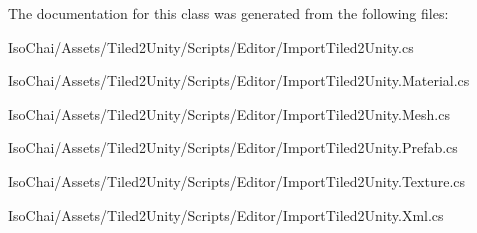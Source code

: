 The documentation for this class was generated from the following files\+:\begin{DoxyCompactItemize}
\item 
Iso\+Chai/\+Assets/\+Tiled2\+Unity/\+Scripts/\+Editor/Import\+Tiled2\+Unity.\+cs\item 
Iso\+Chai/\+Assets/\+Tiled2\+Unity/\+Scripts/\+Editor/Import\+Tiled2\+Unity.\+Material.\+cs\item 
Iso\+Chai/\+Assets/\+Tiled2\+Unity/\+Scripts/\+Editor/Import\+Tiled2\+Unity.\+Mesh.\+cs\item 
Iso\+Chai/\+Assets/\+Tiled2\+Unity/\+Scripts/\+Editor/Import\+Tiled2\+Unity.\+Prefab.\+cs\item 
Iso\+Chai/\+Assets/\+Tiled2\+Unity/\+Scripts/\+Editor/Import\+Tiled2\+Unity.\+Texture.\+cs\item 
Iso\+Chai/\+Assets/\+Tiled2\+Unity/\+Scripts/\+Editor/Import\+Tiled2\+Unity.\+Xml.\+cs\end{DoxyCompactItemize}

